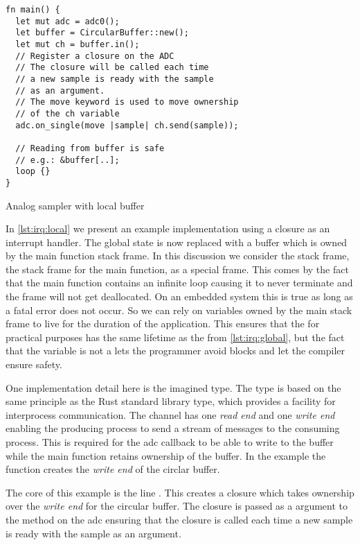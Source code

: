 \begin{listing}[H]
  \begin{verbatim}
fn main() {
  let mut adc = adc0();
  let buffer = CircularBuffer::new();
  let mut ch = buffer.in();
  // Register a closure on the ADC
  // The closure will be called each time
  // a new sample is ready with the sample
  // as an argument.
  // The move keyword is used to move ownership
  // of the ch variable
  adc.on_single(move |sample| ch.send(sample));

  // Reading from buffer is safe
  // e.g.: &buffer[..];
  loop {}
}
  \end{verbatim}
  \caption{Analog sampler with local buffer}
  \label{lst:irq:local}
\end{listing}

In \autoref{lst:irq:local} we present an example implementation using a closure as an interrupt handler.
The global state is now replaced with a buffer which is owned by the main function stack frame.
In this discussion we consider the {\main} stack frame, the stack frame for the main function, as a special frame.
This comes by the fact that the main function contains an infinite loop causing it to never terminate and the frame will not get deallocated.
On an embedded system this is true as long as a fatal error does not occur.
So we can rely on variables owned by the main stack frame to live for the duration of the application.
This ensures that the  for practical purposes has the same lifetime as the  from \autoref{lst:irq:global}, but the fact that the variable is not a  lets the programmer avoid {\unsafe} blocks and let the compiler ensure safety.

One implementation detail here is the imagined  type.
The type is based on the same principle as the Rust standard library  type, which provides a facility for interprocess communication.
The channel has one \textit{read end} and one \textit{write end} enabling the producing process to send a stream of messages to the consuming process.
This is required for the \gls{adc} callback to be able to write to the buffer while the main function retains ownership of the buffer.
In the example the  function creates the \textit{write end} of the circlar buffer.

The core of this example is the line .
This creates a closure which takes ownership over the \textit{write end} for the circular buffer.
The closure is passed as a argument to the  method on the \gls{adc} ensuring that the closure is called each time a new sample is ready with the sample as an argument.


